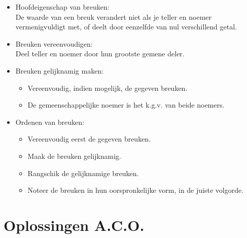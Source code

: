\documentclass[12pt]{article}
\begin{document}
\begin{onthoud}
\begin{itemize}
  \item Hoofdeigenschap van breuken:\\
  De waarde van een breuk verandert niet als je teller en noemer vermenigvuldigt met, of deelt door eenzelfde van nul verschillend getal.
  \item Breuken vereenvoudigen:\\
  Deel teller en noemer door hun grootste gemene deler.
  \item Breuken gelijknamig maken:
  \begin{itemize}
    \item Vereenvoudig, indien mogelijk, de gegeven breuken.
    \item De gemeenschappelijke noemer is het k.g.v. van beide noemers.
  \end{itemize}
  \item Ordenen van breuken:
  \begin{itemize}
    \item Vereenvoudig eerst de gegeven breuken.
    \item Maak de breuken gelijknamig.
    \item Rangschik de gelijknamige breuken.
    \item Noteer de breuken in hun oorspronkelijke vorm, in de juiste volgorde.
  \end{itemize}
\end{itemize}
\end{onthoud}

\newpage
\section*{Oplossingen A.C.O.}

\immediate\closeout\solutionstream

\end{document}
